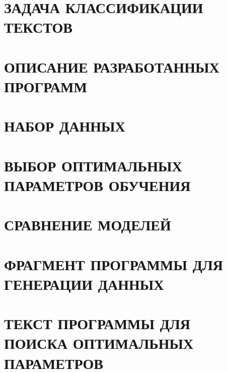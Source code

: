 \documentclass{thesis}
\begin{document}
%

\setcounter{page}{3}

  

\thispagestyle{empty}

\tableofcontents                          %

\thispagestyle{empty}


\chapter{ЗАДАЧА КЛАССИФИКАЦИИ ТЕКСТОВ}
	
	
\chapter{ОПИСАНИЕ РАЗРАБОТАННЫХ ПРОГРАММ}
	

\chapter{НАБОР ДАННЫХ}
  

\chapter{ВЫБОР ОПТИМАЛЬНЫХ ПАРАМЕТРОВ ОБУЧЕНИЯ}
  

\chapter{СРАВНЕНИЕ МОДЕЛЕЙ}
  

	

\break



\appendix
\renewcommand{\thechapter}{\Asbuk{chapter}}
\chapter{ФРАГМЕНТ ПРОГРАММЫ ДЛЯ ГЕНЕРАЦИИ ДАННЫХ}
  \label{app:data-generating}
\chapter{ТЕКСТ ПРОГРАММЫ ДЛЯ ПОИСКА ОПТИМАЛЬНЫХ ПАРАМЕТРОВ}
  \label{app:example}
\end{document}
